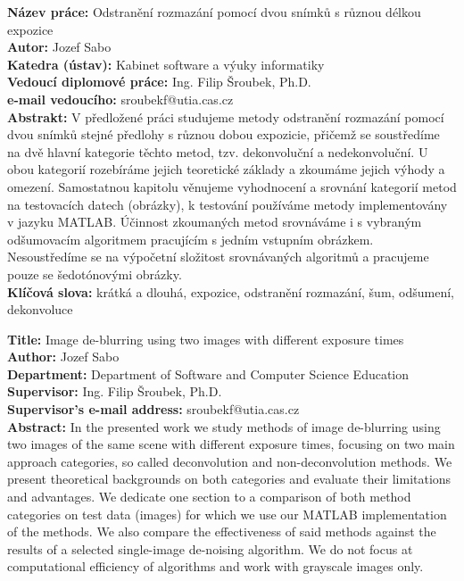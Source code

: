 \documentclass[12pt,notitlepage]{report}
\begin{document}
\tableofcontents %
\listoffigures
\listoftables

\newpage %

\noindent
\textbf{Název práce:} Odstranění rozmazání pomocí dvou snímků s různou délkou expozice\\
\textbf{Autor:} Jozef Sabo\\
\textbf{Katedra (ústav):} Kabinet software a výuky informatiky\\
\textbf{Vedoucí diplomové práce:} Ing. Filip Šroubek, Ph.D.\\
\textbf{e-mail vedoucího:} sroubekf@utia.cas.cz\\

\noindent \textbf{Abstrakt:} V předložené práci studujeme metody odstranění rozmazání pomocí dvou snímků stejné předlohy s různou dobou expozicie, přičemž se soustředíme na dvě hlavní kategorie těchto metod, tzv. dekonvoluční a nedekonvoluční. U obou kategorií rozebíráme jejich teoretické základy a zkoumáme jejich výhody a omezení. Samostatnou kapitolu věnujeme vyhodnocení a srovnání kategorií metod na testovacích datech (obrázky), k testování používáme metody implementovány v jazyku MATLAB. Účinnost zkoumaných metod srovnáváme i s vybraným odšumovacím algoritmem pracujícím s jedním vstupním obrázkem. Nesoustředíme se na výpočetní složitost srovnávaných algoritmů a pracujeme pouze se šedotónovými obrázky.\\

\noindent \textbf{Klíčová slova:} krátká a dlouhá, expozice, odstranění rozmazání, šum,  odšumení, dekonvoluce

\clearpage

\noindent
\textbf{Title:} Image de-blurring using two images with different exposure times\\
\textbf{Author:} Jozef Sabo\\
\textbf{Department:} Department of Software and Computer Science Education\\
\textbf{Supervisor:} Ing. Filip Šroubek, Ph.D.\\
\textbf{Supervisor's e-mail address:} sroubekf@utia.cas.cz\\

\noindent \textbf{Abstract:} In the presented work we study methods of image de-blurring using two images of the same scene with different exposure times, focusing on two main approach categories, so called deconvolution and non-deconvolution methods. We present theoretical backgrounds on both categories and evaluate their limitations and advantages. We dedicate one section to a comparison of both method categories on test data (images) for which we use our MATLAB implementation of the methods. We also compare the effectiveness of said methods against the results of a selected single-image de-noising algorithm. We do not focus at computational efficiency of algorithms and work with grayscale images only.\\
\end{document}
